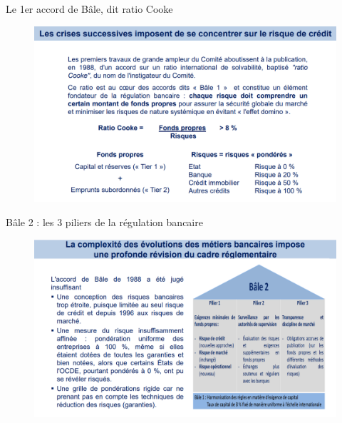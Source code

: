 \begin{frame}{Le 1er accord de Bâle, dit ratio Cooke}
    \begin{figure}[h]
        \centering
        \includegraphics[scale=0.45]{Frames/Les Accords de Bale/p3.png}
    \end{figure}
\end{frame}


\begin{frame}{Bâle 2 : les 3 piliers de la régulation bancaire}
    \begin{figure}[h]
        \centering
        \includegraphics[scale=0.47]{Frames/Les Accords de Bale/p4.png}
    \end{figure}
\end{frame}


